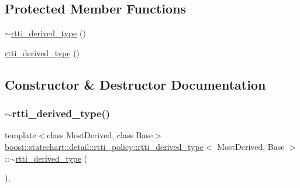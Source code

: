 \subsection*{Protected Member Functions}
\begin{DoxyCompactItemize}
\item 
\mbox{\hyperlink{classboost_1_1statechart_1_1detail_1_1rtti__policy_1_1rtti__derived__type_a07e6d1d15405e4dfbe0b3e4c99cf4001}{$\sim$rtti\+\_\+derived\+\_\+type}} ()
\item 
\mbox{\hyperlink{classboost_1_1statechart_1_1detail_1_1rtti__policy_1_1rtti__derived__type_ab496e7ff254910b40f666527371151f7}{rtti\+\_\+derived\+\_\+type}} ()
\end{DoxyCompactItemize}


\subsection{Constructor \& Destructor Documentation}
\mbox{\label{classboost_1_1statechart_1_1detail_1_1rtti__policy_1_1rtti__derived__type_a07e6d1d15405e4dfbe0b3e4c99cf4001}} 
\subsubsection{\texorpdfstring{$\sim$rtti\+\_\+derived\+\_\+type()}{~rtti\_derived\_type()}}
{\footnotesize\ttfamily template$<$class Most\+Derived, class Base$>$ \\
\mbox{\hyperlink{classboost_1_1statechart_1_1detail_1_1rtti__policy_1_1rtti__derived__type}{boost\+::statechart\+::detail\+::rtti\+\_\+policy\+::rtti\+\_\+derived\+\_\+type}}$<$ Most\+Derived, Base $>$\+::$\sim$\mbox{\hyperlink{classboost_1_1statechart_1_1detail_1_1rtti__policy_1_1rtti__derived__type}{rtti\+\_\+derived\+\_\+type}} (\begin{DoxyParamCaption}{ }\end{DoxyParamCaption})\hspace{0.3cm}{\ttfamily [inline]}, {\ttfamily [protected]}}

